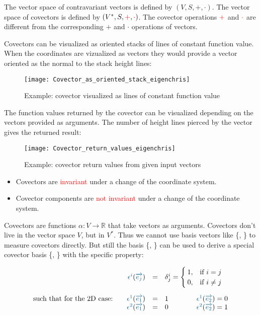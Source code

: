 The vector space of contravariant vectors is defined by $(V,S,+,\cdot)$. The vector space
of covectors is defined by $(V^*,S,\textcolor{red}{+},\textcolor{red}{\cdot})$. The
covector operations $\textcolor{red}{+}$ and $\textcolor{red}{\cdot}$ are different from
the corresponding $+$ and $\cdot$ operations of vectors.

Covectors can be visualized as oriented stacks of lines of constant function value. When
the coordinates are vizualized as vectors they would provide a vector oriented as the
normal to the stack height lines:
\begin{figure}[h]
    \centering
    \texttt{[image: Covector\_as\_oriented\_stack\_eigenchris]}
    \caption{Example: covector visualized as lines of constant function value}
    \label{fig:covector_visualized}
\end{figure}

The function values returned by the covector can be visualized depending on the vectors
provided as arguments. The number of height lines pierced by the vector gives the returned
result:
\begin{figure}[h]
    \centering
    \texttt{[image: Covector\_return\_values\_eigenchris]}
    \caption{Example: covector return values from given input vectors}
    \label{fig:covector_return_values}
\end{figure}

\begin{itemize}
    \item Covectors are \textcolor{red}{invariant} under a change of the coordinate
    system.
    \item Covector components are \textcolor{red}{not invariant} under a change of the
    coordinate system.
\end{itemize}

Covectors are functions $\alpha: V \rightarrow \mathbb{R}$ that take vectors as arguments.
Covectors don't live in the vector space $V$, but in $V^*$. Thus we cannot use basis
vectors like \{, \} to measure covectors directly. But still the basis
\{, \} can be used to derive a special covector basis \{,
\} with the specific property:

\begin{equation}
    \label{eq:covec_vec_link}
    \begin{array}{rcl}
        \hdcbvc{i}(\hdbv{j}) & = &
        \delta^i_j = 
        \begin{cases}
            1, & \text{if}\ i = j \\
            0, & \text{if}\ i \neq j
        \end{cases} \\
        \noalign{\vskip10pt}
        \text{such that for the 2D case:}\qquad
        \hdcbvc{1}(\hdbv{1}) & = & 1 \qquad\qquad
        \hdcbvc{1}(\hdbv{2}) = 0 \\
        \hdcbvc{2}(\hdbv{1}) & = & 0 \qquad\qquad
        \hdcbvc{2}(\hdbv{2}) = 1
    \end{array}
\end{equation}


